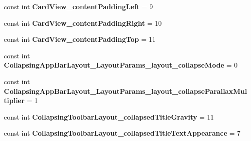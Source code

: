 \begin{DoxyCompactItemize}
\item 
\mbox{\label{class_pinned_app_1_1_droid_1_1_resource_1_1_styleable_ad187c3235a2b06ec475e093e56e107a0}} 
const int {\bfseries Card\+View\+\_\+content\+Padding\+Left} = 9
\item 
\mbox{\label{class_pinned_app_1_1_droid_1_1_resource_1_1_styleable_a951a99e5de9dd6162630e6cd1cc2da17}} 
const int {\bfseries Card\+View\+\_\+content\+Padding\+Right} = 10
\item 
\mbox{\label{class_pinned_app_1_1_droid_1_1_resource_1_1_styleable_a37a5f330429f44c6138a17390e3256d6}} 
const int {\bfseries Card\+View\+\_\+content\+Padding\+Top} = 11
\item 
\mbox{\label{class_pinned_app_1_1_droid_1_1_resource_1_1_styleable_a7b9f810430c0468a54dad365c571a746}} 
const int {\bfseries Collapsing\+App\+Bar\+Layout\+\_\+\+Layout\+Params\+\_\+layout\+\_\+collapse\+Mode} = 0
\item 
\mbox{\label{class_pinned_app_1_1_droid_1_1_resource_1_1_styleable_addb570a3f855c0e39b1a2181dd907a7e}} 
const int {\bfseries Collapsing\+App\+Bar\+Layout\+\_\+\+Layout\+Params\+\_\+layout\+\_\+collapse\+Parallax\+Multiplier} = 1
\item 
\mbox{\label{class_pinned_app_1_1_droid_1_1_resource_1_1_styleable_a6e95096870e14995f41400fbc2828cfe}} 
const int {\bfseries Collapsing\+Toolbar\+Layout\+\_\+collapsed\+Title\+Gravity} = 11
\item 
\mbox{\label{class_pinned_app_1_1_droid_1_1_resource_1_1_styleable_a02a9a030ff42c9a7531f0ba0ed1345c0}} 
const int {\bfseries Collapsing\+Toolbar\+Layout\+\_\+collapsed\+Title\+Text\+Appearance} = 7
\item 
\mbox{\label{class_pinned_app_1_1_droid_1_1_resource_1_1_styleable_a153f49dd0854ed3ac8ec6961d8dff25c}} 

\end{DoxyCompactItemize}
